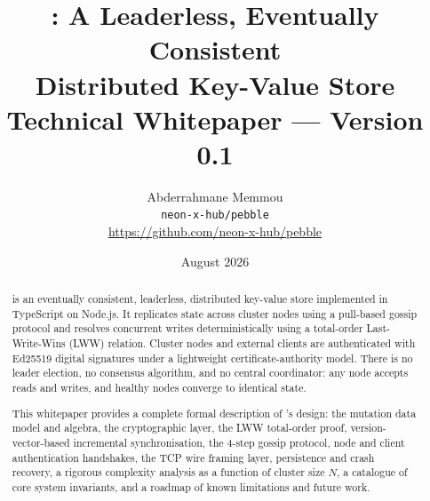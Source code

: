 \documentclass[11pt, a4paper]{article}
\title{
  \vspace{-1.5cm}
  \Large\textbf{\pebble: A Leaderless, Eventually Consistent\\
  Distributed Key-Value Store}\\[0.5em]
  \normalsize Technical Whitepaper --- Version 0.1
}
\author{
  Abderrahmane Memmou\\
  \small\texttt{neon-x-hub/pebble}\\
  \small\url{https://github.com/neon-x-hub/pebble}
}
\date{August 2026}
\begin{document}
\maketitle
\thispagestyle{empty}

\begin{abstract}
\pebble{} is an eventually consistent, leaderless, distributed key-value store
implemented in TypeScript on Node.js. It replicates state across cluster nodes
using a pull-based gossip protocol and resolves concurrent writes deterministically
using a total-order Last-Write-Wins (LWW) relation. Cluster nodes and external
clients are authenticated with Ed25519 digital signatures under a lightweight
certificate-authority model. There is no leader election, no consensus algorithm,
and no central coordinator: any node accepts reads and writes, and healthy nodes
converge to identical state.

This whitepaper provides a complete formal description of \pebble{}'s design:
the mutation data model and algebra, the cryptographic layer, the LWW total-order
proof, version-vector-based incremental synchronisation, the 4-step gossip protocol,
node and client authentication handshakes, the TCP wire framing layer, persistence
and crash recovery, a rigorous complexity analysis as a function of cluster size $N$,
a catalogue of core system invariants, and a roadmap of known limitations and
future work.
\end{abstract}

\tableofcontents
\newpage


















\newpage


\end{document}
